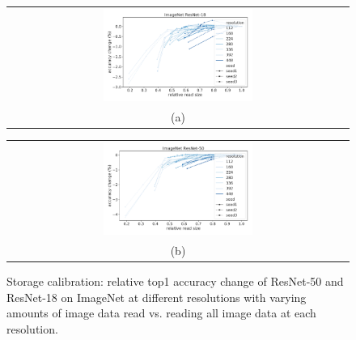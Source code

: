 \begin{figure}
    \centering
    \begin{tabular}{@{}c@{}}
    \includegraphics[width=0.45\textwidth]{e2e_figures/calibration_imagenetresnet18.pdf}\\
    \small (a)
    \end{tabular}
    \begin{tabular}{@{}c@{}}
    \includegraphics[width=0.45\textwidth]{e2e_figures/calibration_imagenetresnet50.pdf}\\
    \small (b)
    \end{tabular}
    \caption{Storage calibration: relative top1 accuracy change of ResNet-50 and ResNet-18 on ImageNet at different resolutions with varying amounts of image data read vs. reading all image data at each resolution. 
    }
    
    \label{fig:calibration_imagenet_ssim}
\end{figure}
